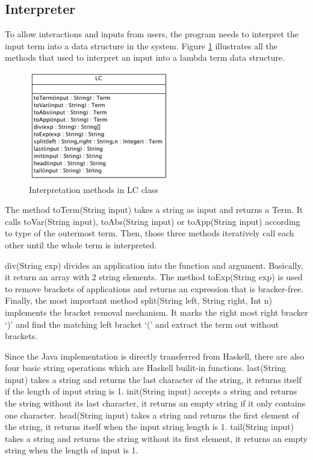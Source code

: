 \subsection{Interpreter}
To allow interactions and inputs from users, the program needs to interpret the input term into a data structure in the system. Figure \ref{fig:inter} illustrates all the methods that used to interpret an input into a lambda term data structure.   

\begin{figure}[ht]
\centering
\includegraphics[scale=0.6]{pics/LC}
\caption{Interpretation methods in LC class}
\label{fig:inter}
\end{figure}

The method \textsf{toTerm(String input)} takes a string as input and returns a \textsf{Term}. It calls \textsf{toVar(String input), toAbs(String input)} or \textsf{toApp(String input)} according to type of the outermost term. Then, those three methods iteratively call each other until the whole term is interpreted.   

\textsf{div(String exp)} divides an application into the function and argument. Basically, it return an array with 2 string elements. The method \textsf{toExp(String exp)} is used to remove brackets of applications and returns an expression that is bracker-free. Finally, the most important method \textsf{split(String left, String right, Int n)} implements the bracket removal mechanism. It marks the right most right bracker `)' and find the matching left bracket `(' and extract the term out without brackets.

Since the Java implementation is directly transferred from Haskell, there are also four basic string operations which are Haskell builit-in functions. \textsf{last(String input)} takes a string and returns the last character of the string, it returns itself if the length of input string is 1. \textsf{init(String input)} accepts a string and returns the string without its last character, it returns an empty string if it only contains one character. \textsf{head(String input)} takes a string and returns the first element of the string, it returns itself when the input string length is 1. \textsf{tail(String input)} takes a string and returns the string without its first element, it returns an empty string when the length of input is 1. 

